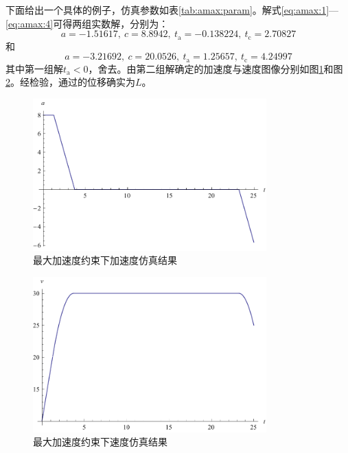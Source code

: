 下面给出一个具体的例子，仿真参数如表\ref{tab:amax:param}。解式\eqref{eq:amax:1}---\eqref{eq:amax:4}可得两组实数解，分别为：
\[a = -1.51617,\ c = 8.8942,\ t_\mathrm{a} = -0.138224,\ t_\mathrm{c} = 2.70827\]
和
\[a = -3.21692,\ c = 20.0526,\ t_\mathrm{a} = 1.25657,\ t_\mathrm{c} = 4.24997\]
其中第一组解$t_\mathrm{a}<0$，舍去。由第二组解确定的加速度与速度图像分别如图\ref{fig:amax:a}和图\ref{fig:amax:v}。经检验，通过的位移确实为$L$。

\begin{figure}[htbp]
\centering
\includegraphics[width=9cm]{figures/uopt/a.pdf}
\caption{最大加速度约束下加速度仿真结果}
\label{fig:amax:a}
\end{figure}
\begin{figure}[htbp]
\centering
\includegraphics[width=9cm]{figures/uopt/v.pdf}
\caption{最大加速度约束下速度仿真结果}
\label{fig:amax:v}
\end{figure}

